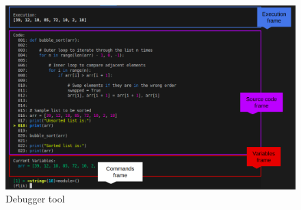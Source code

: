 \begin{figure}[h]
    \centering
    \includegraphics[width=1\textwidth]{figures/flik_interface.png}
    \caption{Debugger tool}
    \label{fig:debugger}
\end{figure}



\endinput


